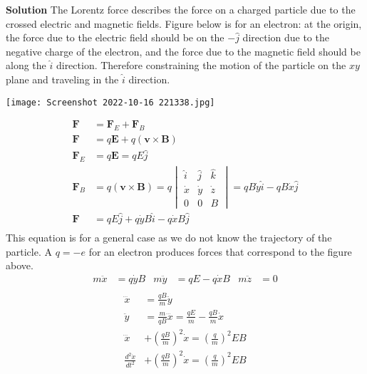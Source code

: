 \documentclass[]{article}
\newcommand{\bd}{\textbf}
\begin{document}
	\bd{Solution} The Lorentz force describes the force on a charged particle due to the crossed electric and magnetic fields. Figure below is for an electron: at the origin, the force due to the electric field should be on the $ -\hat{j} $ direction due to the negative charge of the electron, and the force due to the magnetic field should be along the $ \hat{i} $ direction. Therefore constraining the motion of the particle on the $ xy $ plane and traveling in the $ \hat{i} $ direction.
	\begin{center}
		\texttt{[image: Screenshot 2022-10-16 221338.jpg]}
	\end{center}
	\begin{equation}
		\begin{split}
			\bd{F} &= \bd{F}_E + \bd{F}_B \\
			\bd{F} &= q\bd{E} + q(\bd{v} \times \bd{B}) \\
			\bd{F}_E &= q\bd{E} = qE\hat{j} \\
			\bd{F}_B &= q(\bd{v} \times \bd{B}) = q
			\begin{vmatrix}
				\hat{i} & \hat{j} & \hat{k} \\
				\dot{x} & \dot{y} & \dot{z} \\
				0 & 0 & B
			\end{vmatrix}
			= qB\dot{y} \hat{i} - qB\dot{x} \hat{j} \\
			\bd{F} &=  qE\hat{j} + q\dot{y}B \hat{i} - q\dot{x}B \hat{j} \\
		\end{split}
	\end{equation}
	This equation is for a general case as we do not know the trajectory of the particle. A $ q = -e $ for an electron produces forces that correspond to the figure above.
	\begin{equation}
		\begin{aligned}
			m\ddot{x} &= q\dot{y}B & m\ddot{y} &= qE - q\dot{x}B & m\ddot{z} &= 0 \\
		\end{aligned}
	\end{equation}
	\begin{equation}
		\begin{split}
			\dddot{x} &= \frac{qB}{m}\ddot{y} \\
			\ddot{y} &= \frac{m}{qB}\dddot{x} = \frac{qE}{m} - \frac{qB}{m}\dot{x} \\
			\dddot{x} &+ \left( \frac{qB}{m} \right)^2 \dot{x} = \left( \frac{q}{m} \right)^2 EB \\
			\frac{d^2\dot{x}}{dt^2} &+ \left( \frac{qB}{m} \right)^2 \dot{x} = \left( \frac{q}{m} \right)^2 EB \\
		\end{split}
	\end{equation}
\end{document}
